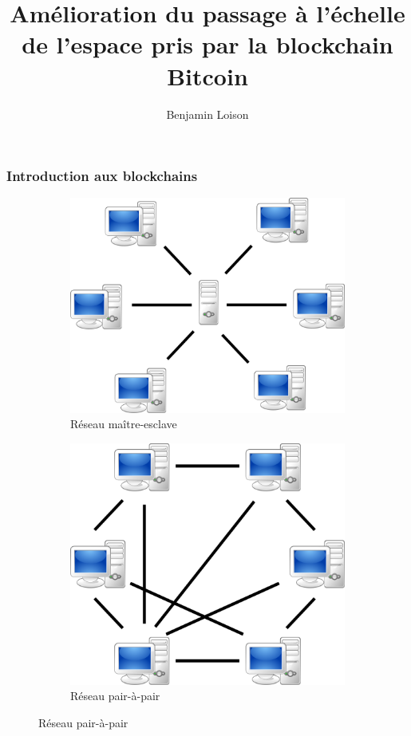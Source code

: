 \documentclass{beamer}
\title{Amélioration du passage à l'échelle de l'espace pris par la blockchain Bitcoin}
\date{}%
\author{Benjamin Loison}
\begin{document}
\frame{\titlepage}


\begin{frame}

\frametitle{Introduction aux blockchains}

\begin{figure}
\centering
\begin{subfigure}{.5\textwidth}
  \centering
  \includegraphics[width=.8\linewidth]{illustrationsSoutenance/clientServer.png}
  \caption{Réseau maître-esclave}
  \label{fig:sub1}
\end{subfigure}%
\begin{subfigure}{.5\textwidth}
  \centering
  \includegraphics[width=.8\linewidth]{illustrationsSoutenance/P2P.png}
  \caption{Réseau pair-à-pair}
  \label{fig:sub2}
\end{subfigure}
\end{figure}
\end{frame}
\end{document}
